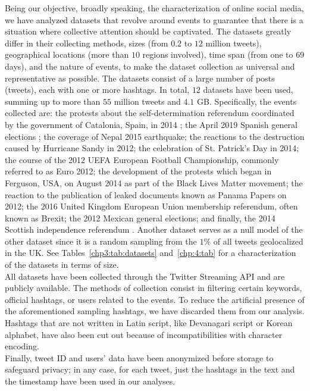  Being our objective, broadly speaking, the characterization of online social media, we have analyzed datasets that revolve around events to guarantee that there is a situation where collective attention should be captivated. The datasets greatly differ in their collecting methods, sizes (from $0.2$ to $12$ million tweets), geographical locations (more than $10$ regions involved), time span (from one to $69$ days), and the nature of events, to make the dataset collection as universal and representative as possible.  The datasets consist of a large number of posts (tweets), each with one or more hashtags. In total, $12$ datasets have been used, summing up to more than $55$ million tweets and $4.1$ GB. Specifically, the events collected are: the protests about the self-determination referendum coordinated by the government of Catalonia, Spain, in 2014 \cite{palazzi2021ecological};  the April 2019 Spanish general elections \cite{palazzi2021ecological}; the coverage of Nepal 2015 earthquake; the reactions to the destruction caused by Hurricane Sandy in 2012; the celebration of St. Patrick's Day in 2014; the course of the 2012 UEFA European Football Championship, commonly referred to as Euro 2012; the development of the protests which began in Ferguson, USA, on August 2014 as part of the Black Lives Matter movement; the reaction to the publication of leaked documents known as Panama Papers on 2012; the 2016 United Kingdom European Union membership referendum, often known as Brexit; the 2012 Mexican general elections; and finally, the 2014 Scottish independence referendum
\cite{zubiaga2018}. Another dataset serves as a null model of the other dataset since it is a random sampling from the $1\%$ of all tweets geolocalized in the UK. See Tables~\ref{chp3:tab:datasets} and~\ref{chp:4:tab} for a characterization of the datasets in terms of size.\\
 

 All datasets have been collected through the Twitter Streaming API and are publicly available. The methods of collection consist in filtering certain keywords, official hashtags, or users related to the events. To reduce the artificial presence of the aforementioned sampling hashtags, we have discarded them from our analysis. Hashtags that are not written in Latin script, like Devanagari script or Korean alphabet, have also been cut out because of incompatibilities with character encoding. \\

Finally, tweet ID and  users' data have been anonymized before storage to safeguard privacy; in any case, for each tweet, just the hashtags in the text and the timestamp have been used in our analyses. 


